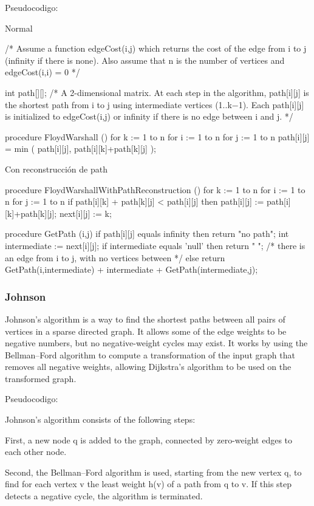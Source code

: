\documentclass[10pt,letterpaper,twocolumn,twosided]{article}
\begin{document}
Pseudocodigo:

Normal

/* Assume a function edgeCost(i,j) which returns the cost of the edge from i to j
    (infinity if there is none).
    Also assume that n is the number of vertices and edgeCost(i,i) = 0
*/
 
 int path[][];
 /* A 2-dimensional matrix. At each step in the algorithm, path[i][j] is the shortest path
    from i to j using intermediate vertices (1..k−1).  Each path[i][j] is initialized to
    edgeCost(i,j) or infinity if there is no edge between i and j.
 */

 procedure FloydWarshall ()
    for k := 1 to n
       for i := 1 to n
          for j := 1 to n
             path[i][j] = min ( path[i][j], path[i][k]+path[k][j] );

Con reconstrucción de path

procedure FloydWarshallWithPathReconstruction ()
    for k := 1 to n
       for i := 1 to n
          for j := 1 to n
             if path[i][k] + path[k][j] < path[i][j] then
                path[i][j] := path[i][k]+path[k][j];
                next[i][j] := k;

 procedure GetPath (i,j)
    if path[i][j] equals infinity then
      return "no path";
    int intermediate := next[i][j];
    if intermediate equals 'null' then
      return " ";   /* there is an edge from i to j, with no vertices between */
   else
      return GetPath(i,intermediate) + intermediate + GetPath(intermediate,j);

\subsubsection{Johnson}

Johnson's algorithm is a way to find the shortest paths between all pairs of vertices in a
sparse directed graph. It allows some of the edge weights to be negative numbers, but no 
negative-weight cycles may exist. It works by using the Bellman–Ford algorithm to compute a
transformation of the input graph that removes all negative weights, allowing Dijkstra's algorithm 
to be used on the transformed graph.

Pseudocodigo:

Johnson's algorithm consists of the following steps:

First, a new node q is added to the graph, connected by zero-weight edges to each other node.

Second, the Bellman–Ford algorithm is used, starting from the new vertex q, to find for each vertex v the 
least weight h(v) of a path from q to v. If this step detects a negative cycle, the algorithm is terminated.
\end{document}

